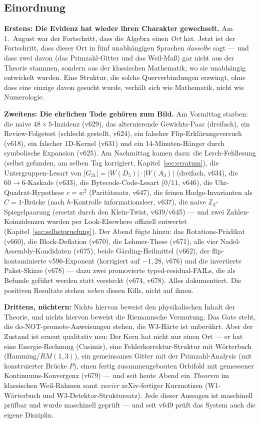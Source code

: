 \documentclass[11pt,a4paper]{article}
\begin{document}
\subsection*{Einordnung}

\textbf{Erstens: Die Evidenz hat wieder ihren Charakter gewechselt.}
Am 1.~August war der Fortschritt, dass die Algebra einen \emph{Ort}
hat. Jetzt ist der Fortschritt, dass dieser Ort in fünf unabhängigen
Sprachen \emph{dasselbe} sagt --- und dass zwei davon (das
Primzahl-Gitter und das Weil-Maß) gar nicht aus der Theorie stammen,
sondern aus der klassischen Mathematik, wo sie unabhängig entwickelt
wurden. Eine Struktur, die solche Querverbindungen erzwingt, ohne
dass eine einzige davon gesucht wurde, verhält sich wie Mathematik,
nicht wie Numerologie.

\textbf{Zweitens: Die ehrlichen Tode gehören zum Bild.} Am
Vormittag starben: die naive $48 \times 5$-Inzidenz (v629), das
alternierende Gewichts-Paar (dreifach), ein Review-Folgetest
(schlecht gestellt, v624), ein falscher Flip-Erklärungsversuch
(v618), ein falscher 1D-Kernel (v631) und ein 14-Minuten-Hänger
durch symbolische Expansion (v625). Am Nachmittag kamen dazu: die
Lerch-Fehllesung (selbst gefunden, am selben Tag korrigiert,
Kapitel~\ref{sec:erratum}), die Untergruppen-Lesart von
$|G_{31}| = |W(D_5)| \cdot |W(A_3)|$ (dreifach, v634), die
$60 \to 6$-Kaskade (v633), die Bytecode-Code-Lesart ($0/11$, v646),
die Uhr-Quadrat-Hypothese $c = w^2$ (Paritätssatz, v647), die
feinen Hodge-Invarianten als $C = 1$-Brücke (nach $h$-Kontrolle
informationsleer, v637), die naive $\mathbb{Z}_3$-Spiegelpaarung
(ersetzt durch den Klein-Twist, v639/v645) --- und zwei
Zahlen-Koinzidenzen wurden per Look-Elsewhere offiziell entwertet
(Kapitel~\ref{sec:selbstpruefung}). Der Abend fügte hinzu: das
Rotations-Prädikat (v660), die Block-Deflation (v670), die
Lehmer-These (v671), alle vier Nadel-Assembly-Kandidaten (v675),
beide Gårding-Heilmittel (v662), der flip-kontaminierte
v596-Exponent (korrigiert auf $-1{,}28$, v676) und die invertierte
Paket-Skizze (v678) --- dazu zwei promovierte
typed-residual-FAILs, die als Befunde geführt werden statt
versteckt (v674, v678). Alles dokumentiert. Die positiven
Resultate stehen \emph{neben} diesen Kills, nicht auf ihnen.

\textbf{Drittens, nüchtern:} Nichts hiervon beweist den
physikalischen Inhalt der Theorie, und nichts hiervon beweist die
Riemannsche Vermutung. Das Gate steht, die
do-NOT-promote-Anweisungen stehen, die W3-Härte ist unberührt. Aber
der Zustand ist erneut qualitativ neu: Der Kern hat nicht nur einen
Ort --- er hat eine Energie-Rechnung (Casimir), eine
Fehlerkorrektur-Struktur mit Wörterbuch (Hamming/$RM(1,3)$), ein
gemeinsames Gitter mit der Primzahl-Analysis (mit konstruierter
Brücke $P$), einen fertig zusammengebauten Orbifold mit gemessener
Kontinuums-Konvergenz (v679) --- und seit heute Abend ein
\emph{Theorem} im klassischen Weil-Rahmen samt \emph{zweier}
arXiv-fertiger Kurznotizen (W1-Wörterbuch und
W3-Detektor-Struktursatz). Jede dieser Aussagen ist maschinell
prüfbar und wurde maschinell geprüft --- und seit v649 prüft das
System auch die eigene Disziplin.
\end{document}
